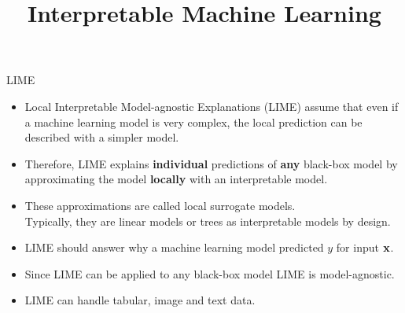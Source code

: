 \documentclass[11pt,compress,t,notes=noshow, aspectratio=169, xcolor=table]{beamer}
\title{Interpretable Machine Learning}
\date{}
\begin{document}
	




\newcommand{\titlefigure}{figure/lime5}
\newcommand{\learninggoals}{
	\item Understand motivation for LIME
	\item Develop a mathematical intuition
	\item See various applications}



\begin{frame}[c]{LIME}
\begin{itemize}
		\item Local Interpretable Model-agnostic Explanations (LIME) assume that even if a machine learning model is very complex, the local prediction can be described with a simpler model.
		\smallskip\pause
		\item  Therefore, LIME explains \textbf{individual} predictions of \textbf{any} black-box model by approximating the model \textbf{locally} with an interpretable model.
		\smallskip\pause
		\item These approximations are called local surrogate models. \\
		Typically, they are linear models or trees as interpretable models by design.
		\smallskip\pause
		\item LIME should answer why a machine learning model predicted $y$ for input $\xv$.
		\smallskip\pause
		\item Since LIME can be applied to any black-box model LIME is model-agnostic.  
		\smallskip\pause
		\item LIME can handle tabular, image and text data. 
\end{itemize}
\end{frame}
\end{document}
